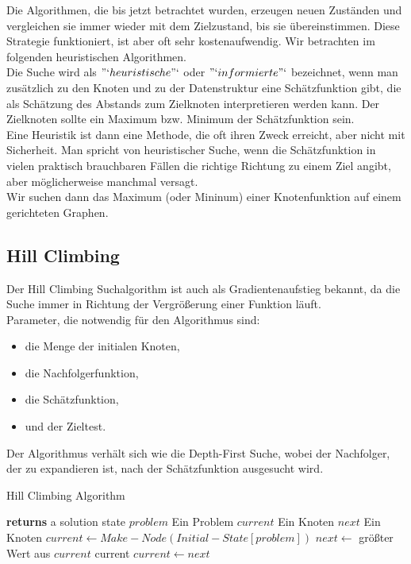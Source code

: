 \documentclass[fleqn]{article}
\numberwithin{equation}{section}
\numberwithin{figure}{section}
\numberwithin{table}{section}
\begin{document}
Die Algorithmen, die bis jetzt betrachtet wurden, erzeugen neuen Zuständen und vergleichen sie immer wieder mit dem Zielzustand, bis sie übereinstimmen. Diese Strategie funktioniert, ist aber oft sehr kostenaufwendig. Wir betrachten im folgenden heuristischen Algorithmen.\\

Die Suche wird als $"`heuristische"`$ oder $"`informierte"`$ bezeichnet, wenn man zusätzlich zu den Knoten und zu der Datenstruktur eine Schätzfunktion gibt, die als Schätzung des Abstands zum Zielknoten interpretieren werden kann. Der Zielknoten sollte ein Maximum bzw. Minimum der Schätzfunktion sein.\\

Eine Heuristik ist dann eine Methode, die oft ihren Zweck erreicht, aber nicht mit Sicherheit. Man spricht von heuristischer Suche, wenn die Schätzfunktion in vielen praktisch brauchbaren Fällen die richtige Richtung zu einem Ziel angibt, aber möglicherweise manchmal versagt.\\

Wir suchen dann das Maximum (oder Mininum) einer Knotenfunktion auf einem gerichteten Graphen.\\

\subsection{Hill Climbing}
\bigskip
Der Hill Climbing Suchalgorithm ist auch als Gradientenaufstieg bekannt, da die Suche immer in Richtung der Vergrößerung einer Funktion läuft.\\

Parameter, die notwendig für den Algorithmus sind:

\begin{itemize}
  \item die Menge der initialen Knoten,
  \item die Nachfolgerfunktion,
  \item die Schätzfunktion,
  \item und der Zieltest.
\end{itemize}

Der Algorithmus verhält sich wie die Depth-First Suche, wobei der Nachfolger, der zu expandieren ist, nach der Schätzfunktion ausgesucht wird.\\

\begin{algorithm}
\caption{Hill Climbing Algorithm}
\begin{algorithmic}[1]
 \State \textbf{returns} a solution state
\INPUT
\Statex $problem$ \Comment Ein Problem
\Statex $current$  \Comment Ein Knoten
\Statex $next$  \Comment Ein Knoten
\State $current \gets Make-Node(Initial-State[problem])$
\Loop
\State $next \gets$ größter Wert aus $current$
 \Return current
\EndIf
\State $current \gets next$
\EndLoop
\EndFunction
\end{algorithmic}
\end{algorithm}
\end{document}
